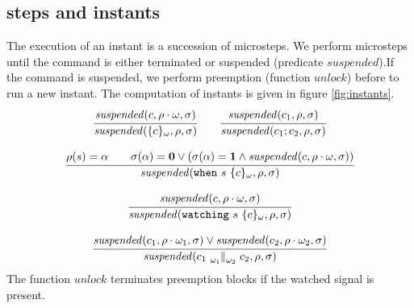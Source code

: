 \def\kill{{\mathit{kill}}}
\def\collect{{\mathit{collect}}}
\newcommand{\addressOf}[1]{#1\lightning}

\def\suspended{{\mathit{suspended}}}
\def\unlock{{\mathit{unlock}}}

\subsection{steps and instants}

The execution of an instant is a succession of microsteps. We perform microsteps until
the command is either terminated or suspended (predicate $\suspended$).If the
command is suspended, we perform preemption (function $\unlock$) before to run a new instant.
The computation of instants is given in figure \ref{fig:instants}.
$$
  \begin{array}{c}
    \cfrac{
      \suspended(c,\env \cdot \omega,\heap)
    }{
      \suspended(\{c\}_\omega,\env,\heap)
    }
    \qquad
    \cfrac{
      \suspended(c_1,\env,\heap)
    }{
      \suspended(c_1;c_2,\env,\heap)
    }
    \\\\
    \cfrac{
      \env(s)=\alpha \qquad
      \heap(\alpha)=\absent \vee (\heap(\alpha)=\present \wedge
        {\mathit{suspended}}(c,\env \cdot \omega,\heap))
    }
    {{\mathit{suspended}}(\when{s}{\{c\}_\omega},\env,\heap)}
    \\\\
    \cfrac{
      \suspended(c,\env\cdot \omega,\heap)
    }{
      \suspended(\watching{s}{\{c\}_\omega},\env,\heap)
    }
    \\\\
    \cfrac{
      \suspended(c_1,\env \cdot \omega_1,\heap) \vee
      \suspended(c_2,\env \cdot \omega_2,\heap)
    }{
      \suspended({c_1} \parl{\omega_1}{\omega_2} {c_2}, \env, \heap)
    }
  \end{array}
$$
The function $\unlock$ terminates preemption blocks if the watched signal is present.

